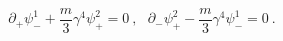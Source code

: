 \begin{equation}
\partial_+ \psi^1_- + \frac{m}{3} \gamma^4 \psi^2_+ = 0 ~,~~~
\partial_- \psi^2_+ - \frac{m}{3} \gamma^4 \psi^1_- = 0 ~.
\label{feom}
\end{equation}

